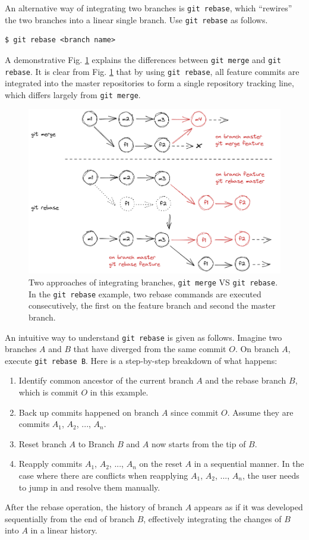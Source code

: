 An alternative way of integrating two branches is \verb|git rebase|, which ``rewires'' the two branches into a linear single branch. Use \verb|git rebase| as follows.
\begin{lstlisting}
$ git rebase <branch name>
\end{lstlisting}
A demonstrative Fig. \ref{ch:sma:fig:gitrebase} explains the differences between \verb|git merge| and \verb|git rebase|. It is clear from Fig. \ref{ch:sma:fig:gitrebase} that by using \verb|git rebase|, all feature commits are integrated into the master repositories to form a single repository tracking line, which differs largely from \verb|git merge|.
\begin{figure}[!htb]
	\centering
	\includegraphics[width=350pt]{chapters/part-3/figures/gitrebase.png}
	\caption{Two approaches of integrating branches, \texttt{git merge} VS \texttt{git rebase}. In the \texttt{git rebase} example, two rebase commands are executed consecutively, the first on the feature branch and second the master branch.} \label{ch:sma:fig:gitrebase}
\end{figure}

An intuitive way to understand \verb|git rebase| is given as follows. Imagine two branches $A$ and $B$ that have diverged from the same commit $O$. On branch $A$, execute \verb|git rebase B|. Here is a step-by-step breakdown of what happens:
\begin{enumerate}
	\item Identify common ancestor of the current branch $A$ and the rebase branch $B$, which is commit $O$ in this example.
	\item Back up commits happened on branch $A$ since commit $O$. Assume they are commits $A_1$, $A_2$, ..., $A_n$.
	\item Reset branch $A$ to Branch $B$ and $A$ now starts from the tip of $B$.
	\item Reapply commits $A_1$, $A_2$, ..., $A_n$ on the reset $A$ in a sequential manner. In the case where there are conflicts when reapplying $A_1$, $A_2$, ..., $A_n$, the user needs to jump in and resolve them manually.
\end{enumerate}
After the rebase operation, the history of branch $A$ appears as if it was developed sequentially from the end of branch $B$, effectively integrating the changes of $B$ into $A$ in a linear history.


